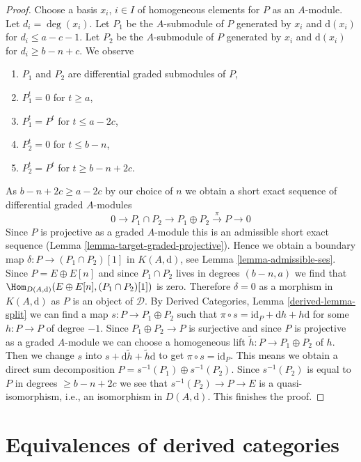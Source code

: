 \begin{proof}
\medskip\noindent
Choose a basis $x_i$, $i \in I$ of homogeneous elements for $P$ as an
$A$-module. Let $d_i = \deg(x_i)$.
Let $P_1$ be the $A$-submodule of $P$ generated by $x_i$ and
$\text{d}(x_i)$ for $d_i \leq a - c - 1$.
Let $P_2$ be the $A$-submodule of $P$ generated by $x_i$ and
$\text{d}(x_i)$ for $d_i \geq b - n + c$.
We observe
\begin{enumerate}
\item $P_1$ and $P_2$ are differential graded submodules of $P$,
\item $P_1^t = 0$ for $t \geq a$,
\item $P_1^t = P^t$ for $t \leq a - 2c$,
\item $P_2^t = 0$ for $t \leq b - n$,
\item $P_2^t = P^t$ for $t \geq b - n + 2c$.
\end{enumerate}
As $b - n + 2c \geq a - 2c$ by our choice of $n$
we obtain a short exact sequence of differential graded $A$-modules
$$
0 \to P_1 \cap P_2 \to P_1 \oplus P_2 \xrightarrow{\pi} P \to 0
$$
Since $P$ is projective as a graded $A$-module this is an admissible
short exact sequence (Lemma \ref{lemma-target-graded-projective}).
Hence we obtain a boundary map
$\delta : P \to (P_1 \cap P_2)[1]$ in $K(A, \text{d})$, see
Lemma \ref{lemma-admissible-ses}.
Since $P = E \oplus E[n]$ and since $P_1 \cap P_2$ lives in
degrees $(b - n, a)$ we find that
$\Hom_{D(A, \text{d})}(E \oplus E[n], (P_1 \cap P_2)[1])$ is
zero. Therefore $\delta = 0$ as a morphism in $K(A, \text{d})$
as $P$ is an object of $\mathcal{D}$.
By Derived Categories, Lemma \ref{derived-lemma-split}
we can find a map $s : P \to P_1 \oplus P_2$ such that
$\pi \circ s = \text{id}_P + \text{d}h + h\text{d}$ for some $h : P \to P$
of degree $-1$. Since $P_1 \oplus P_2 \to P$ is surjective and since $P$
is projective as a graded $A$-module we can choose a homogeneous
lift $\tilde h : P \to P_1 \oplus P_2$ of $h$. Then we change
$s$ into $s + \text{d} \tilde h + \tilde h \text{d}$ to get
$\pi \circ s = \text{id}_P$. This means we obtain a direct
sum decomposition $P = s^{-1}(P_1) \oplus s^{-1}(P_2)$.
Since $s^{-1}(P_2)$ is equal to $P$ in degrees $\geq b - n + 2c$
we see that $s^{-1}(P_2) \to P \to E$ is a quasi-isomorphism,
i.e., an isomorphism in $D(A, \text{d})$. This finishes the proof.
\end{proof}








\section{Equivalences of derived categories}
\label{section-equivalence}

